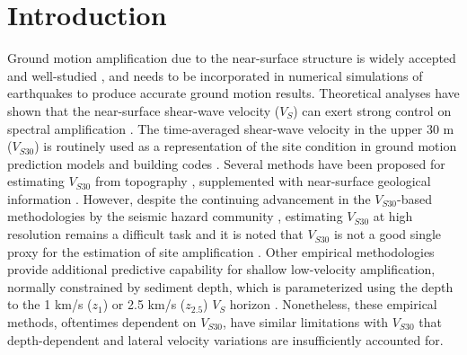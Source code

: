 \section{Introduction} \label{vs30:intro}
Ground motion amplification due to the near-surface structure is widely accepted and well-studied , and needs to be incorporated in numerical  simulations of earthquakes to produce accurate ground motion results. Theoretical analyses have shown that the near-surface shear-wave velocity ($V_S$) can exert strong control on spectral amplification \citep{joynerEffectQuaternaryAlluvium1981,booreEstimationGroundMotion1991,andersonControlStrongMotion1996,dayRMSResponseOnedimensional1996}. The time-averaged shear-wave velocity in the upper 30 m ($V_{S30}$) is routinely used as a representation of the site condition in ground motion prediction models and building codes \citep{borcherdtEstimatesSiteDependentResponse1994,bozorgniaNGAWest2ResearchProject2014,internationalcodecouncil2015IBCInternational2014}. Several methods have been proposed for estimating $V_{S30}$ from topography \citep{waldTopographicSlopeProxy2007}, supplemented with near-surface geological information \citep{thompsonVS30MapCalifornia2014,willsNextGeneration302015}. However, despite the continuing advancement in the $V_{S30}$-based methodologies by the seismic hazard community ,  estimating $V_{S30}$ at high resolution remains a difficult task and it is noted that $V_{S30}$ is not a good single proxy for the estimation of site amplification . Other empirical methodologies provide additional predictive capability for shallow low-velocity amplification, normally constrained by sediment depth, which is parameterized using the depth to the 1 km/s ($z_1$) or 2.5 km/s ($z_{2.5}$) $V_S$ horizon . Nonetheless, these empirical methods, oftentimes dependent on $V_{S30}$, have similar limitations with $V_{S30}$ that depth-dependent and lateral velocity variations are insufficiently accounted for.

